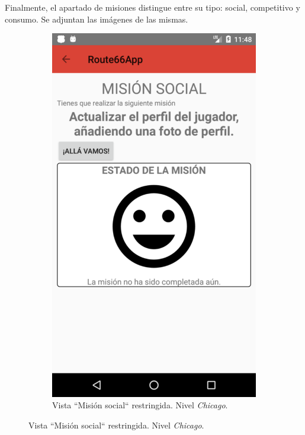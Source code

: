 \documentclass[twoside]{report}
\begin{document}
Finalmente, el apartado de misiones distingue entre su tipo: social, competitivo y consumo. Se adjuntan las imágenes de las mismas.
\begin{figure}[H]
\begin{center}
	\begin{subfigure}[t]{.3\linewidth}
		\includegraphics[scale=0.25]{images/userguide/25.png}
		\caption{Vista “Misión social“ restringida. Nivel \textit{Chicago}.}
	\end{subfigure}\hspace{2mm}%

\end{center}
\end{figure}
\end{document}
